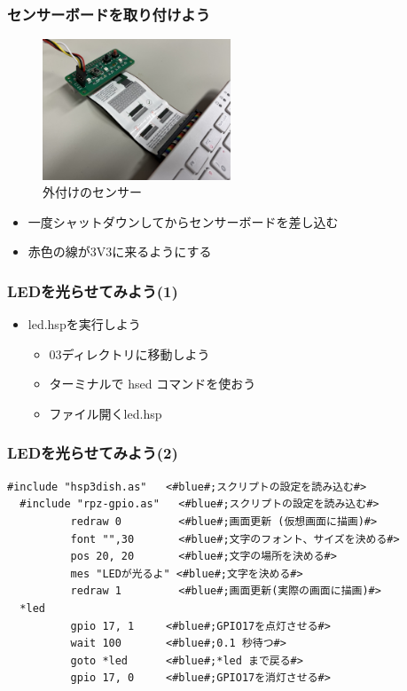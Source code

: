\begin{frame}
  \frametitle{センサーボードを取り付けよう}
  \begin{figure}
    \centering

    \includegraphics[width=0.5\textwidth]{../images/chap03/how_to_install_bme280.jpg}
    \caption{外付けのセンサー}
  \end{figure}
  \begin{itemize}
    \item 一度シャットダウンしてからセンサーボードを差し込む
    \item 赤色の線が3V3に来るようにする
  \end{itemize}
\end{frame}

\begin{frame}
  \frametitle{LEDを光らせてみよう(1)}
  \begin{itemize}
    \item led.hspを実行しよう
          \begin{itemize}
            \item 03ディレクトリに移動しよう
            \item ターミナルで hsed コマンドを使おう
            \item ファイル\rightarrow 開く\rightarrow led.hsp
          \end{itemize}
  \end{itemize}
\end{frame}

\begin{frame}[fragile]
  \frametitle{LEDを光らせてみよう(2)}
  \begin{lstlisting}[title=led.hsp,label=led.hsp]
  #include "hsp3dish.as"   <#blue#;スクリプトの設定を読み込む#>
  #include "rpz-gpio.as"   <#blue#;スクリプトの設定を読み込む#>
          redraw 0         <#blue#;画面更新 (仮想画面に描画)#>
          font "",30       <#blue#;文字のフォント、サイズを決める#>
          pos 20, 20       <#blue#;文字の場所を決める#>
          mes "LEDが光るよ" <#blue#;文字を決める#>
          redraw 1         <#blue#;画面更新(実際の画面に描画)#>
  *led
          gpio 17, 1     <#blue#;GPIO17を点灯させる#>
          wait 100       <#blue#;0.1 秒待つ#>
          goto *led      <#blue#;*led まで戻る#>
          gpio 17, 0     <#blue#;GPIO17を消灯させる#>
  \end{lstlisting}
\end{frame}

